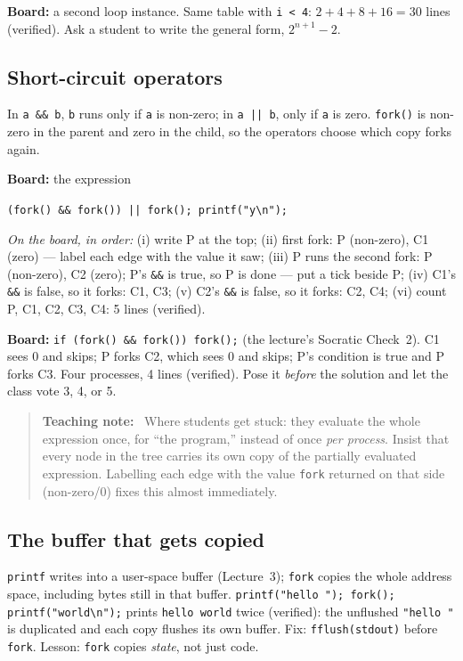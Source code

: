 \documentclass[11pt]{article}
\newenvironment{teachingaside}{\begin{quote}\small\color{primary-gold}\textbf{Teaching note:}\ }{\end{quote}}
\begin{document}
\textbf{Board:} a second loop instance. Same table with \texttt{i < 4}: $2 + 4 + 8 + 16 = 30$ lines (verified). Ask a student to write the general form, $2^{n+1} - 2$.

\subsection*{Short-circuit operators}

In \texttt{a \&\& b}, \texttt{b} runs only if \texttt{a} is non-zero; in \texttt{a || b}, only if \texttt{a} is zero. \texttt{fork()} is non-zero in the parent and zero in the child, so the operators choose which copy forks again.

\textbf{Board:} the expression
\begin{center}\texttt{(fork() \&\& fork()) || fork(); printf("y\textbackslash n");}\end{center}
\emph{On the board, in order:} (i) write P at the top; (ii) first fork: P (non-zero), C1 (zero) --- label each edge with the value it saw; (iii) P runs the second fork: P (non-zero), C2 (zero); P's \texttt{\&\&} is true, so P is done --- put a tick beside P; (iv) C1's \texttt{\&\&} is false, so it forks: C1, C3; (v) C2's \texttt{\&\&} is false, so it forks: C2, C4; (vi) count P, C1, C2, C3, C4: 5 lines (verified).

\textbf{Board:} \texttt{if (fork() \&\& fork()) fork();} (the lecture's Socratic Check~2). C1 sees 0 and skips; P forks C2, which sees 0 and skips; P's condition is true and P forks C3. Four processes, 4 lines (verified). Pose it \emph{before} the solution and let the class vote 3, 4, or 5.

\begin{teachingaside}
Where students get stuck: they evaluate the whole expression once, for ``the program,'' instead of once \emph{per process}. Insist that every node in the tree carries its own copy of the partially evaluated expression. Labelling each edge with the value \texttt{fork} returned on that side (non-zero/0) fixes this almost immediately.
\end{teachingaside}

\subsection*{The buffer that gets copied}

\texttt{printf} writes into a user-space buffer (Lecture~3); \texttt{fork} copies the whole address space, including bytes still in that buffer. \texttt{printf("hello "); fork(); printf("world\textbackslash n");} prints \texttt{hello world} twice (verified): the unflushed \texttt{"hello "} is duplicated and each copy flushes its own buffer. Fix: \texttt{fflush(stdout)} before \texttt{fork}. Lesson: \texttt{fork} copies \emph{state}, not just code.
\end{document}
